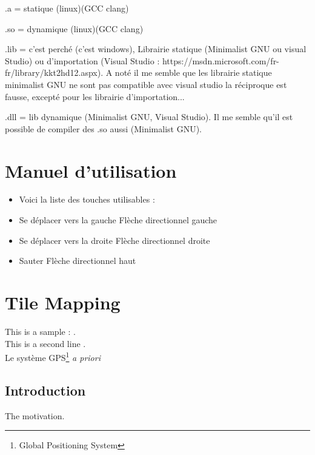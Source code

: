 \documentclass[12pt]{article}
\begin{document}
.a = statique (linux)(GCC clang)

.so = dynamique (linux)(GCC clang)

.lib = c'est perché (c'est windows), Librairie statique (Minimalist GNU ou visual Studio) ou d'importation (Visual Studio : https://msdn.microsoft.com/fr-fr/library/kkt2hd12.aspx). 
A noté il me semble que les librairie statique minimalist GNU ne sont pas compatible avec visual studio la réciproque est fausse, excepté pour les librairie d'importation...

.dll = lib dynamique (Minimalist GNU, Visual Studio). Il me semble qu'il est possible de compiler des .so aussi (Minimalist GNU).
\newpage

\section{Manuel d'utilisation}
\begin{itemize}
\item Voici la liste des touches utilisables :
\item Se déplacer vers la gauche	Flèche directionnel  gauche
\item Se déplacer vers la droite	Flèche directionnel  droite
\item Sauter	Flèche directionnel  haut
\end{itemize}
\newpage

\section{Tile Mapping}
This is a sample : \cite{JS2015}.\\
This is a second line \cite{bworld}.\\
Le système GPS\footnote{Global Positioning System}
\emph{a priori}
\subsection{Introduction}
The motivation.
\end{document}
